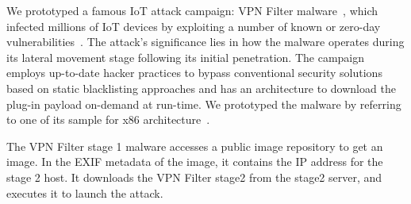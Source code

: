 We prototyped a famous IoT attack campaign: VPN Filter malware~\cite{vpnfilterschenier}, which infected millions of IoT devices by exploiting a number of known or zero-day vulnerabilities~\cite{vpnfilter1,vpnfilter2}. 
The attack's significance lies in how the malware operates during its lateral movement stage following its initial penetration. 
The campaign employs up-to-date hacker practices to bypass conventional security solutions based on static blacklisting approaches and has an architecture to download the plug-in payload on-demand at run-time. 
We prototyped the malware by referring to one of its sample for x86 architecture~\cite{vpnfilterx86}.

The VPN Filter stage 1 malware accesses a public image repository to get an image. In the EXIF metadata of the image, it contains the IP address for the stage 2 host. It downloads the VPN Filter stage2 from the stage2 server, and executes it to launch the attack.


